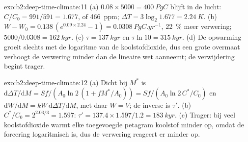 \begin{solution}{exo:b2:deep-time-climate:11}
(a) $0.08\times5000 = \qty{400}{PgC}$ blijft in de lucht: $C/C_0 = 991/591 = 1.677$, of
\qty{466}{ppm}; $\Delta T = 3\log_2 1.677 = \qty{2.24}{K}$. (b) $W - W_0 = 0.138\,(e^{0.09\times2.24}
- 1) = \qty{0.0308}{PgC.yr^{-1}}$, \qty{22}{\percent} meer verwering; $5000/0.0308 =
\qty{162}{kyr}$. (c) $\tau = \qty{137}{kyr}$ en $\tau\ln10 = \qty{315}{kyr}$. (d) De opwarming groeit
slechts met de logaritme van de koolstofdioxide, dus een grote overmaat verhoogt de verwering minder dan de
lineaire wet aanneemt; de verwijdering begint trager.
\end{solution}

\begin{solution}{exo:b2:deep-time-climate:12}
(a) Dicht bij $M^*$ is $\mathrm d\Delta T/\mathrm dM = Sf/(A_0\ln 2\,(1 + fM^*/A_0)) = Sf/(A_0\ln 2\,
C^*/C_0)$ en $\mathrm dW/\mathrm dM = kW\,\mathrm d\Delta T/\mathrm dM$, met daar $W = V$; de
inverse is $\tau'$. (b) $C^*/C_0 = 2^{2.03/3} = 1.597$: $\tau' = 137.4\times1.597/1.2 =
\qty{183}{kyr}$. (c) Trager: bij veel koolstofdioxide warmt elke toegevoegde petagram koolstof minder op,
omdat de forcering logaritmisch is, dus de verwering reageert er minder op.
\end{solution}

